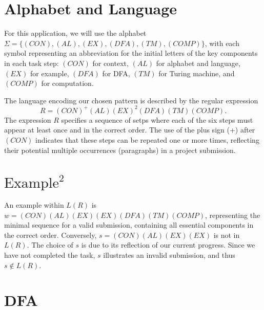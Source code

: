 \documentclass{article}
\begin{document}
\section*{Alphabet and Language}

For this application, we will use the alphabet $\Sigma = \{(CON), (AL), (EX), (DFA), (TM), (COMP)\}$, with each symbol representing an abbreviation for the initial letters of the key components in each task step: $(CON)$ for context, $(AL)$ for alphabet and language, $(EX)$ for example, $(DFA)$ for DFA, $(TM)$ for Turing machine, and $(COMP)$ for computation.

The language encoding our chosen pattern is described by the regular expression
\[
  R = (CON)^+(AL)(EX)^2(DFA)(TM)(COMP).
\]
The expression $R$ specifies a sequence of setps where each of the six steps must appear at least once and in the correct order. The use of the plus sign (+) after $(CON)$ indicates that these steps can be repeated one or more times, reflecting their potential multiple occurrences (paragraphs) in a project submission. 

\section*{$\text{Example}^2$}

An example within $L(R)$ is $w = (CON)(AL)(EX)(EX)(DFA)(TM)(COMP)$, representing the minimal sequence for a valid submission, containing all essential components in the correct order. Conversely, $s = (CON)(AL)(EX)(EX)$ is not in $L(R)$. The choice of $s$ is due to its reflection of our current progress. Since we have not completed the task, $s$ illustrates an invalid submission, and thus $s \notin L(R)$.
 
\section*{DFA}
\end{document}
